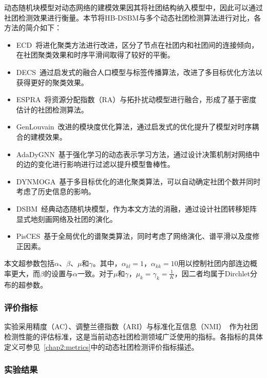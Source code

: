 动态随机块模型对动态网络的建模效果因其将社团结构纳入模型中，因此可以通过社团检测效果进行衡量。本节将HB-DSBM与多个动态社团检测算法进行对比，各方法的简介如下：
\begin{itemize}
	\item ECD~\cite{liu2019evolutionary}将进化聚类方法进行改进，区分了节点在社团内和社团间的连接倾向，在社团聚类效果和时序平滑间取得了较好的平衡。
	\item DECS~\cite{liu2020detecting}通过启发式的融合人口模型与标签传播算法，改进了多目标优化方法以获得更好的聚类效果。
	\item ESPRA~\cite{wang2017dynamic}将资源分配指数（RA）与拓扑扰动模型进行融合，形成了基于密度估计的社团检测算法。
	\item GenLouvain~\cite{jutla2011generalized}改进的模块度优化算法，通过启发式的优化提升了模型对时序耦合的建模效果。
	\item AdaDyGNN~\cite{Li2024DyGNN}基于强化学习的动态表示学习方法，通过设计决策机制对网络中的边的变化进行影响进行过滤以提升模型鲁棒性。
	\item DYNMOGA~\cite{folino2014evolutionary}基于多目标优化的进化聚类算法，可以自动确定社团个数并同时考虑了历史信息的影响。
	\item DSBM~\cite{yang2011detecting}经典动态随机块模型，作为本文方法的消融，通过设计社团转移矩阵显式地刻画网络及社团的演化。
	\item PisCES~\cite{liu2018global}基于全局优化的谱聚类算法，同时考虑了网络演化、谱平滑以及度修正因素。
\end{itemize}

本文超参数包括$\alpha$、$\beta$、$\mu$和$\gamma$。其中，$\alpha_{kl} = 1$，$\alpha_{kk} = 10$用以控制社团内部连边概率更大，而$\beta$的设置与$\alpha$一致。对于$\mu$和$\gamma$，$\mu_k = \gamma_k = \frac{1}{K}$，因二者均属于Dirchlet分布的超参数。

\subsubsection{评价指标}

实验采用精度（AC）、调整兰德指数（ARI）与标准化互信息（NMI）~\cite{gong2007machine}作为社团检测性能的评估标准，这是当前动态社团检测领域广泛使用的指标。各指标的具体定义可参见~\ref{chap2:metrics}中的动态社团检测评价指标描述。

\subsubsection{实验结果}


